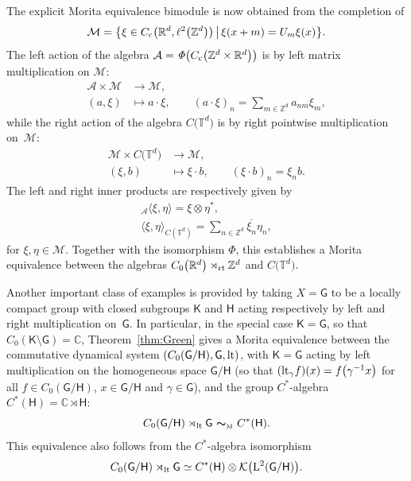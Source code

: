 \documentclass[10pt,a4paper]{amsart}
\numberwithin{equation}{section}
\newcommand{\Z}{\zed}
\newcommand{\mbf}[1]{{\boldsymbol {#1} }}
\newcommand{\CK}{\mathcal{K}}
\newcommand{\sfG}{\mathsf{G}}
\newcommand{\sfH}{\mathsf{H}}
\newcommand{\sfK}{\mathsf{K}}
\newcommand{\Leb}{{\rm L}}
\newcommand{\lt}{{\rm lt}}
\newcommand{\rt}{{\rm rt}}
\newcommand{\complex}{{\mathbb C}} %
\newcommand{\zed}{{\mathbb Z}} %
\newcommand{\real}{{\mathbb R}} %
\newcommand{\torus}{{\mathbb T}} %
\def\alg{{\mathcal A}}
\def\Mcal{{\mathcal M}}
\begin{document}
\begin{Example}[tori]
The explicit Morita equivalence bimodule is now obtained from the
completion of
\[
\Mcal = \big\{\xi\in C_{\rm c}\big(\real^d,\ell^2\big(\Z^d\big)\big) \, \big| \, \xi(x+m) =
U_m \xi(x) \big\} .
\]
The left action of the algebra $\alg={\mathit\Phi}\big(C_{\rm c}\big(\Z^d\times\real^d\big)\big)$ is by left
matrix multiplication on $\Mcal$:
\begin{align*}
\alg\times\Mcal &\longrightarrow\Mcal , \\
(a,\xi) & \longmapsto a\cdot\xi , \qquad (a\cdot\xi)_n=\sum_{m\in\Z^d}
a_{nm} \xi_m ,
\end{align*}
while the right action of the algebra $C\big(\torus^d\big)$ is by right pointwise
multiplication on~$\Mcal$:
\begin{align*}
\Mcal\times C\big(\torus^d\big) & \longrightarrow\Mcal , \nonumber \\
(\xi,b) & \longmapsto \xi\cdot b , \qquad (\xi\cdot b)_n=\xi_n b .
\end{align*}
The left and right inner
products are respectively given by
\begin{gather*}
{}_\alg\langle\xi,\eta\rangle = \xi\otimes\eta^* , \\
\langle\xi,\eta\rangle_{C(\torus^d)} = \sum_{n\in\zed^d}
\overline{\xi_n} \eta_n ,
\end{gather*}
for $\xi,\eta\in\Mcal$.
Together with the isomorphism $\mathit\Phi$, this establishes a
Morita equivalence between the algebras $C_0\big(\real^d\big)\rtimes_\rt\zed^d$
and $C\big(\torus^d\big)$.
\end{Example}

Another important class of examples is provided by taking
$X=\sfG$ to be a locally
compact group with closed subgroups $\sfK$ and $\sfH$ acting respectively by
left and right multiplication on~$\sfG$.
In particular, in the special case $\sfK =\sfG$, so that
$C_0(\sfK {\setminus} \sfG)=\complex$, Theorem~\ref{thm:Green} gives a Morita equivalence between the commutative dynamical system
$(C_0(\sfG/\sfH ), \sfG, \lt)$, with $\sfK =\sfG$ acting by left multiplication on the
homogeneous space $\sfG/\sfH $ (so that $(\lt_\gamma f)(x)=f\big(\gamma^{-1} x\big)$ for all $f\in
C_0(\sfG/\sfH )$, $x\in \sfG/\sfH $ and $\gamma\in \sfG$),
and the group $C^*$-algebra $C^*(\sfH )=\complex\rtimes \sfH $:
\[
C_0(\sfG/\sfH )\rtimes_\lt \sfG \ \mbf\sim_{\text{\tiny M}} \ C^*(\sfH ) .
\]
This equivalence also follows from the $C^*$-algebra isomorphism~\cite[Theorem~4.29]{Williams2007}
\[ %
C_0(\sfG/\sfH )\rtimes_\lt \sfG \simeq C^*(\sfH )\otimes
\CK\big(\Leb^2(\sfG/\sfH )\big) .
\]
\end{document}
